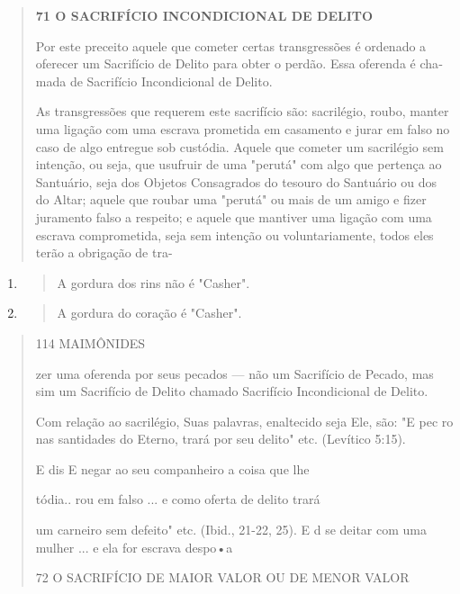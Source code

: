 \begin{quote}
\textbf{71 O SACRIFÍCIO INCONDICIONAL DE DELITO}

Por este preceito aquele que cometer certas transgressões é ordena­do a
oferecer um Sacrifício de Delito para obter o perdão. Essa oferenda é
cha­mada de Sacrifício Incondicional de Delito.

As transgressões que requerem este sacrifício são: sacrilégio, roubo,
manter uma ligação com uma escrava prometida em casamento e jurar em
falso no caso de algo entregue sob custódia. Aquele que cometer um
sacrilégio sem intenção, ou seja, que usufruir de uma "perutá" com algo
que pertença ao San­tuário, seja dos Objetos Consagrados do tesouro do
Santuário ou dos do Altar; aquele que roubar uma "perutá" ou mais de um
amigo e fizer juramento falso a respeito; e aquele que mantiver uma
ligação com uma escrava comprometi­da, seja sem intenção ou
voluntariamente, todos eles terão a obrigação de tra-
\end{quote}

\begin{enumerate}
\def\labelenumi{\arabic{enumi}.}
\setcounter{enumi}{87}
\item
  \begin{quote}
  A gordura dos rins não é "Casher".
  \end{quote}
\item
  \begin{quote}
  A gordura do coração é "Casher".
  \end{quote}
\end{enumerate}

\begin{quote}
114 MAIMÔNIDES

zer uma oferenda por seus pecados --- não um Sacrifício de Pecado, mas
sim um Sacrifício de Delito chamado Sacrifício Incondicional de Delito.

Com relação ao sacrilégio, Suas palavras, enaltecido seja Ele, são: "E
pec ro nas santidades do Eterno, trará por seu delito" etc. (Levítico
5:15).

E dis E negar ao seu companheiro a coisa que lhe

tódia.. rou em falso ... e como oferta de delito trará

um carneiro sem defeito" etc. (Ibid., 21-22, 25). E d se deitar com uma
mulher ... e ela for escrava despo•a

72 O SACRIFÍCIO DE MAIOR VALOR OU DE MENOR VALOR
\end{quote}

